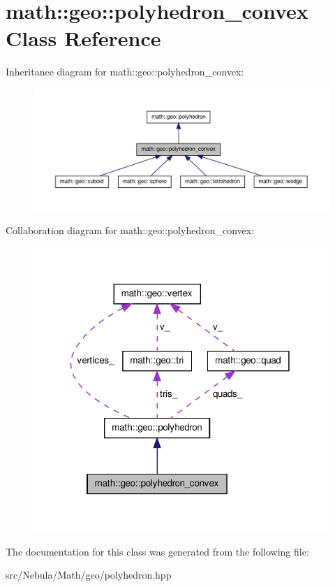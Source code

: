 \hypertarget{classmath_1_1geo_1_1polyhedron__convex}{\section{math\-:\-:geo\-:\-:polyhedron\-\_\-convex \-Class \-Reference}
\label{classmath_1_1geo_1_1polyhedron__convex}
}


\-Inheritance diagram for math\-:\-:geo\-:\-:polyhedron\-\_\-convex\-:\nopagebreak
\begin{figure}[H]
\begin{center}
\leavevmode
\includegraphics[width=350pt]{classmath_1_1geo_1_1polyhedron__convex__inherit__graph}
\end{center}
\end{figure}


\-Collaboration diagram for math\-:\-:geo\-:\-:polyhedron\-\_\-convex\-:\nopagebreak
\begin{figure}[H]
\begin{center}
\leavevmode
\includegraphics[width=314pt]{classmath_1_1geo_1_1polyhedron__convex__coll__graph}
\end{center}
\end{figure}


\-The documentation for this class was generated from the following file\-:\begin{DoxyCompactItemize}
\item 
src/\-Nebula/\-Math/geo/polyhedron.\-hpp\end{DoxyCompactItemize}
